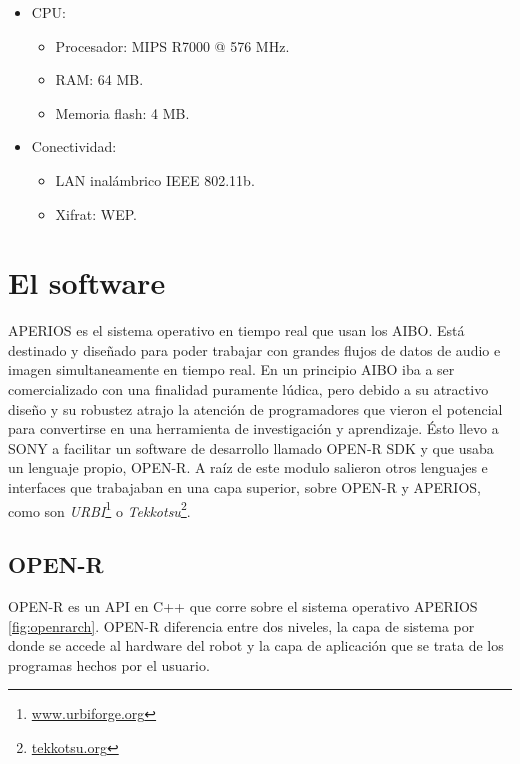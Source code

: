 \documentclass[12pt,a4paper,final,twoside]{book}
\begin{document}
\begin{multicols}{2}
\begin{itemize}
\begin{itemize}
\item Altura: 278 mm.
\item Largo: 319 mm.
\item Ancho: 180 mm.
\item Peso con batería: 1.65 Kg. 
\end{itemize}
\item CPU:
\begin{itemize}
\item Procesador: MIPS R7000 @ 576 MHz.
\item RAM: 64 MB.
\item Memoria flash: 4 MB.
\end{itemize}
\end{itemize}
\begin{itemize}
\item Conectividad:
\begin{itemize}
\item LAN inalámbrico IEEE 802.11b.
\item Xifrat: WEP.
\end{itemize}
\end{itemize}
\end{multicols}

\section{El software}
APERIOS es el sistema operativo en tiempo real que usan los AIBO. Está destinado y diseñado para poder trabajar con grandes flujos de datos de audio e imagen simultaneamente en tiempo real.
En un principio AIBO iba a ser comercializado con una finalidad puramente lúdica, pero debido a su atractivo diseño y su robustez atrajo la atención de programadores que vieron el potencial para convertirse en una herramienta de investigación y aprendizaje. Ésto llevo a SONY a facilitar un software de desarrollo llamado OPEN-R SDK y que usaba un lenguaje propio, OPEN-R. A raíz de este modulo salieron otros lenguajes e interfaces que trabajaban en una capa superior, sobre OPEN-R y APERIOS, como son \textit{URBI}\footnote{\url{www.urbiforge.org}} o \textit{Tekkotsu}\footnote{\url{tekkotsu.org}}.

\subsection{OPEN-R}
OPEN-R es un API en C++ que corre sobre el sistema operativo APERIOS \ref{fig:openrarch}. OPEN-R diferencia entre dos niveles, la capa de sistema por donde se accede al hardware del robot y la capa de aplicación que se trata de los programas hechos por el usuario.
\end{document}
